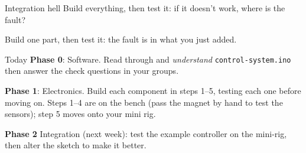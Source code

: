 \documentclass[aspectratio=169]{beamer}
\begin{document}
\begin{frame}{Integration hell}
    \Large
    Build everything, then test it: if it doesn't work, where is the fault?

    \vspace{.75em}
    Build one part, then test it: the fault is in what you just added.
    \vspace{1.5em}
    \begin{center}
    \end{center}
\end{frame}



\begin{frame}{Today}
    \large
    \textbf{Phase 0}: Software. Read through and \emph{understand} \texttt{control-system.ino} then answer the check questions in your groups.

    \vspace{1em}
    \textbf{Phase 1}: Electronics. Build each component in steps 1--5, testing each one before moving on. Steps 1--4 are on the bench (pass the magnet by hand to test the sensors); step 5 moves onto your mini rig.

    \vspace{1em}
    {\color{lightgray}
    \textbf{Phase 2} Integration (next week): test the example controller on the mini-rig, then alter the sketch to make it better.
    }
\end{frame}
\end{document}

